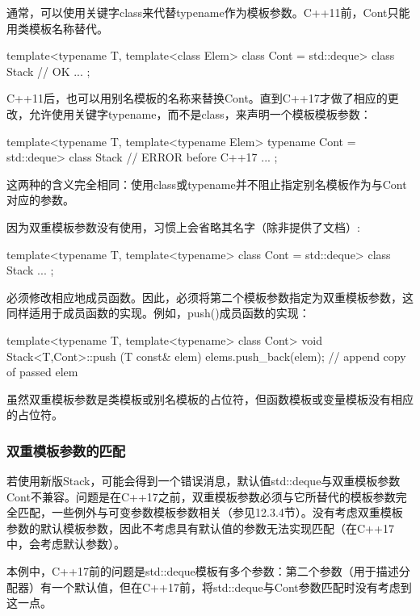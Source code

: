 通常，可以使用关键字class来代替typename作为模板参数。C++11前，Cont只能用类模板名称替代。

\begin{cpp}
template<typename T,
		template<class Elem> class Cont = std::deque>
class Stack { // OK
	...
};
\end{cpp}

C++11后，也可以用别名模板的名称来替换Cont。直到C++17才做了相应的更改，允许使用关键字typename，而不是class，来声明一个模板模板参数：

\begin{cpp}
template<typename T,
		template<typename Elem> typename Cont = std::deque>
class Stack { // ERROR before C++17
	...
};
\end{cpp}

这两种的含义完全相同：使用class或typename并不阻止指定别名模板作为与Cont对应的参数。

因为双重模板参数没有使用，习惯上会省略其名字（除非提供了文档）:

\begin{cpp}
template<typename T,
		template<typename> class Cont = std::deque>
class Stack {
	...
};
\end{cpp}

必须修改相应地成员函数。因此，必须将第二个模板参数指定为双重模板参数，这同样适用于成员函数的实现。例如，push()成员函数的实现：

\begin{cpp}
template<typename T, template<typename> class Cont>
void Stack<T,Cont>::push (T const& elem) {
	elems.push_back(elem); // append copy of passed elem
}
\end{cpp}

虽然双重模板参数是类模板或别名模板的占位符，但函数模板或变量模板没有相应的占位符。

\subsubsection{双重模板参数的匹配}

若使用新版Stack，可能会得到一个错误消息，默认值std::deque与双重模板参数Cont不兼容。问题是在C++17之前，双重模板参数必须与它所替代的模板参数完全匹配，一些例外与可变参数模板参数相关（参见12.3.4节）。没有考虑双重模板参数的默认模板参数，因此不考虑具有默认值的参数无法实现匹配（在C++17中，会考虑默认参数）。

本例中，C++17前的问题是std::deque模板有多个参数：第二个参数（用于描述分配器）有一个默认值，但在C++17前，将std::deque与Cont参数匹配时没有考虑到这一点。

